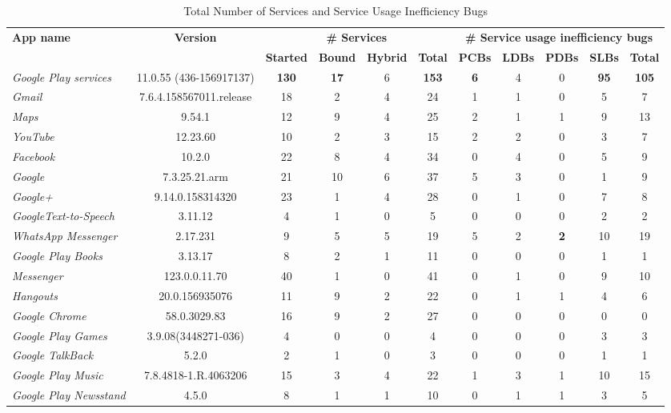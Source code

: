 \documentclass[sigconf,review, anonymous]{acmart}
\begin{document}
\begin{table}
\centering
\small
\caption{Total Number of Services and Service Usage Inefficiency Bugs}
\begin{tabular}{|l|c|cccc|ccccc|}\hline
{\bf App name}&\multicolumn{1}{|c|}{\textbf{Version}}&\multicolumn{4}{|c|}{\textbf{\# Services}} &\multicolumn{5}{|c|}{\textbf{\# Service usage inefficiency bugs}}\\
&{\bf }&{\bf Started}&{\bf Bound}&{\bf Hybrid} &{\bf Total} & {\bf PCBs}&{\bf LDBs}&{\bf PDBs} &{\bf SLBs}&{\bf Total}\\
\hline
\hline
{\it Google Play services} & 11.0.55 (436-156917137) & {\bf 130} & {\bf 17} & 6 & {\bf 153} & {\bf 6 }& 4 & 0 & {\bf 95} & {\bf 105}\\
{\it Gmail} & 7.6.4.158567011.release & 18 & 2 & 4 & 24 & 1 & 1 & 0 & 5 & 7\\
{\it Maps} & 9.54.1 & 12 & 9 & 4 & 25 & 2 & 1 & 1 & 9 & 13\\
{\it YouTube} & 12.23.60 & 10 & 2 & 3 & 15 & 2 & 2 & 0 & 3 & 7\\
{\it Facebook} & 10.2.0 & 22 & 8 & 4 & 34 & 0 & 4 & 0 & 5 & 9\\
{\it Google} & 7.3.25.21.arm & 21 & 10 & 6 & 37 & 5 & 3 & 0 & 1 & 9\\
{\it Google+} & 9.14.0.158314320 & 23 & 1 & 4 & 28 & 0 & 1 & 0 & 7 & 8\\
{\it GoogleText-to-Speech} & 3.11.12 & 4 & 1 & 0 & 5 & 0 & 0 & 0 & 2 & 2\\
{\it WhatsApp Messenger} & 2.17.231 & 9 & 5 & 5 & 19 &  5 & 2 & {\bf 2} & 10 & 19\\
{\it Google Play Books} & 3.13.17 & 8 & 2 & 1 & 11 & 0 & 0 & 0 & 1 & 1\\
{\it Messenger} & 123.0.0.11.70 & 40 & 1 & 0 & 41 & 0 & 1 & 0 & 9 & 10\\
{\it Hangouts} & 20.0.156935076 & 11 & 9 & 2 & 22 & 0 & 1 & 1 & 4 & 6\\
{\it Google Chrome} & 58.0.3029.83 & 16 & 9 & 2 & 27 & 0 & 0 & 0 & 0 & 0\\
{\it Google Play Games} & 3.9.08(3448271-036) & 4 & 0 & 0 & 4 & 0 & 0 & 0 & 3 & 3\\
{\it Google TalkBack} & 5.2.0 & 2 & 1 & 0 & 3 & 0 & 0 & 0 & 1 & 1\\
{\it Google Play Music} & 7.8.4818-1.R.4063206 & 15 & 3 & 4 & 22 & 1 & 3 & 1 & 10 & 15\\
{\it Google Play Newsstand} & 4.5.0 & 8 & 1 & 1 & 10 & 0 & 1 & 1 & 3 & 5\\

\end{tabular}
\end{table}
\end{document}
